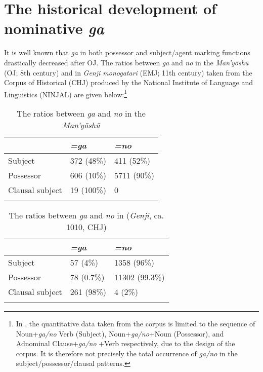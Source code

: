 \documentclass[output=paper]{LSP/langsci}
\begin{document}
\section{The historical development of nominative \textit{ga}} \label{14-ya-sec:4}

It is well known that \textit{ga} in both possessor and subject/agent marking functions drastically decreased after OJ. The ratios between \textit{ga} and \textit{no} in the \textit{Man’y\=osh\=u} (OJ; 8th century) and in \textit{Genji monogatari} (EMJ; 11th century) taken from the Corpus of Historical  (CHJ) produced by the National Institute of  Language and Linguistics (NINJAL) are given below:\footnote{In , the quantitative data taken from the corpus is limited to the sequence of Noun+\textit{ga/no} Verb (Subject), Noun+\textit{ga/no}+Noun (Possessor), and Adnominal Clause+\textit{ga/no} +Verb respectively, due to the design of the corpus. It is therefore not precisely the total occurrence of \textit{ga/no} in the subject/possessor/clausal patterns.} 

\begin{table}
\caption{The ratios between \textit{ga} and \textit{no} in the \textit{Man’y\=osh\=u} \citep{Koji1988Many}}\label{14-ya-tab:2}
\begin{tabularx}{\textwidth}{XXX} 
\lsptoprule
& \textit{=ga} & \textit{=no}\\
\midrule
Subject & 372 (48\%) & 411 (52\%)\\
Possessor & 606 (10\%) & 5711 (90\%)\\
Clausal subject & 19 (100\%) & 0\\
\lspbottomrule
\end{tabularx}
\end{table}

\begin{table}
\caption{The ratios between \textit{ga} and \textit{no} in (\textit{Genji}, ca. 1010, CHJ)}\label{14-ya-tab:3}
\begin{tabularx}{\textwidth}{XXX} 
\lsptoprule
& \textit{=ga} & \textit{=no}\\
\midrule
Subject & 57 (4\%) & 1358 (96\%)\\
Possessor & 78 (0.7\%) & 11302 (99.3\%)\\
Clausal subject & 261 (98\%) & 4 (2\%)\\
\lspbottomrule
\end{tabularx}
\end{table}
\end{document}
